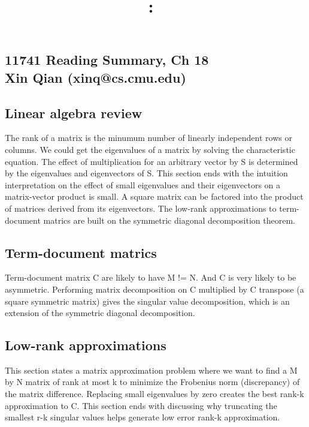 \documentclass[10pt]{article}
\title{
\textmd{\textbf{\hmwkClass:\ \hmwkTitle}
}}
\author{\textbf{\hmwkAuthorName}}
\begin{document}
\subsection{11741 Reading Summary, Ch 18 \\Xin Qian (xinq@cs.cmu.edu)}
\subsection{Linear algebra review}
The rank of a matrix is the minumum number of linearly independent rows or columns. We could get the eigenvalues of a matrix by solving the characteristic equation. The effect of multiplication for an arbitrary vector by S is determined by the eigenvalues and eigenvectors of S. This section ends with the intuition interpretation on the effect of small eigenvalues and their eigenvectors on a matrix-vector product is small. A square matrix can be factored into the product of matrices derived from its eigenvectors. The low-rank approximations to term-document matrics are built on the symmetric diagonal decomposition theorem.
\subsection{Term-document matrics}
Term-document matrix C are likely to have M != N. And C is very likely to be asymmetric. Performing matrix decomposition on C multiplied by C transpose (a square symmetric matrix) gives the singular value decomposition, which is an extension of the symmetric diagonal decomposition. 
\subsection{Low-rank approximations}
This section states a matrix approximation problem where we want to find a M by N matrix of rank at most k to minimize the Frobenius norm (discrepancy) of the matrix difference. Replacing small eigenvalues by zero creates the best rank-k approximation to C. This section ends with discussing why truncating the smallest r-k singular values helps generate low error rank-k approximation. 
\end{document}
